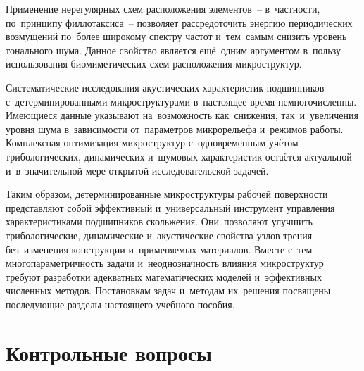 Применение нерегулярных схем расположения элементов~-- в~частности, по~принципу филлотаксиса~-- позволяет рассредоточить энергию периодических возмущений по~более широкому спектру частот и~тем~самым снизить уровень тонального шума. Данное свойство является ещё~одним аргументом в~пользу использования биомиметических схем расположения микроструктур.

Систематические исследования акустических характеристик подшипников с~детерминированными микроструктурами в~настоящее время немногочисленны. Имеющиеся данные указывают на~возможность как~снижения, так~и~увеличения уровня шума в~зависимости от~параметров микрорельефа и~режимов работы. Комплексная оптимизация микроструктур с~одновременным учётом трибологических, динамических и~шумовых характеристик остаётся актуальной и~в~значительной мере открытой исследовательской задачей.

Таким образом, детерминированные микроструктуры рабочей поверхности представляют собой эффективный и~универсальный инструмент управления характеристиками подшипников скольжения. Они~позволяют улучшить трибологические, динамические и~акустические свойства узлов трения без~изменения конструкции и~применяемых материалов. Вместе с~тем многопараметричность задачи и~неоднозначность влияния микроструктур требуют разработки адекватных математических моделей и~эффективных численных методов. Постановкам задач и~методам их~решения посвящены последующие разделы настоящего учебного пособия.

\FloatBarrier
\section*{Контрольные вопросы}

